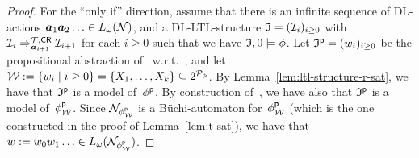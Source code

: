 \begin{proof}
    For the \enquote{only if} direction, assume that there is an infinite
    sequence of DL-actions $\boldsymbol a_1\boldsymbol a_2\dotso\in L_\omega(\mathcal{N})$, and a
    DL-LTL-structure $\mathfrak{I}=(\mathcal{I}_i)_{i\ge 0}$ with
    $\mathcal{I}_i\Rightarrow_{\boldsymbol a_{i+1}}^{\mathcal{T},\mathsf{CR}}\mathcal{I}_{i+1}$ for each $i\ge 0$ such
    that we have $\mathfrak{I},0\models\phi$.
    Let $\mathfrak{I}^\mathsf{p}=(w_i)_{i\ge 0}$ be the propositional abstraction of~\Imf
    w.r.t.~\psf, and let
    $\mathcal{W}:=\{w_i\mid i\ge 0\}=\{X_1,\dots,X_k\}\subseteq 2^{\mathcal{P}_\phi}$.  By
    Lemma~\ref{lem:ltl-structure-r-sat}, we have that $\mathfrak{I}^\mathsf{p}$ is a model
    of~$\phi^\mathsf{p}$.  By construction of~\Wmc, we have also that $\mathfrak{I}^\mathsf{p}$ is a
    model of~$\phi^\mathsf{p}_\mathcal{W}$.  Since $\mathcal{N}_{\phi^\mathsf{p}_\mathcal{W}}$ is a
    Büchi-automaton for~$\phi^\mathsf{p}_\mathcal{W}$ (which is the one constructed in the
    proof of Lemma~\ref{lem:t-sat}), we have that
    $w:=w_0w_1\dotso\in L_\omega(\mathcal{N}_{\phi^\mathsf{p}_\mathcal{W}})$.


\end{proof}
